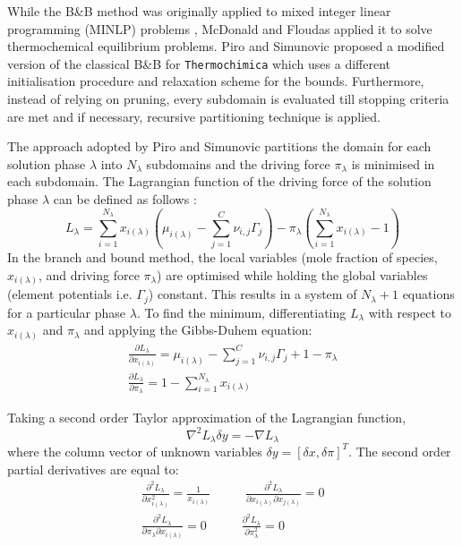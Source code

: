 	 While the B\&B method was originally applied to mixed integer linear programming (MINLP) problems \cite{Jaulin01}, McDonald and Floudas \cite{McDonald95} applied it to solve thermochemical equilibrium problems. Piro and Simunovic \cite{Piro16} proposed a modified version of the classical B\&B for \texttt{Thermochimica} which uses a different initialisation procedure and relaxation scheme for the bounds. Furthermore, instead of relying on pruning, every subdomain is evaluated till stopping criteria are met and if necessary, recursive partitioning technique is applied.

	 The approach adopted by Piro and Simunovic \cite{Piro16} partitions the domain for each solution phase $\lambda$ into $N_\lambda$ subdomains and the driving force $\pi_\lambda$ is minimised in each subdomain. The Lagrangian function of the driving force of the solution phase $\lambda$ can be defined as follows \cite{Piro16}:
	 \begin{equation}
	 	L_\lambda = \sum_{i=1}^{N_\lambda} x_{i(\lambda)}\left( \mu_{i(\lambda)} - \sum_{j=1}^{C} \nu_{i,j}\Gamma_j \right) - \pi_{\lambda}\left( \sum_{i=1}^{N_\lambda} x_{i(\lambda)} -  1 \right)
	 \end{equation}
	 In the branch and bound method, the local variables (mole fraction of species, $x_{i(\lambda)}$, and driving force $\pi_{\lambda}$) are optimised while holding the global variables (element potentials i.e. $\Gamma_j$) constant. This results in a system of $N_{\lambda} + 1$ equations for a particular phase $\lambda$. To find the minimum, differentiating $L_\lambda$ with respect to $x_{i(\lambda)}$ and $\pi_{\lambda}$ and applying the Gibbs-Duhem equation:
	 \begin{gather}
	 	\frac{\partial L_\lambda}{\partial x_{i(\lambda)}} = \mu_{i(\lambda)} - \sum_{j=1}^{C} \nu_{i,j}\Gamma_j + 1 - \pi_{\lambda} \\
		\frac{\partial L_\lambda}{\partial \pi_{\lambda}} = 1- \sum_{i=1}^{N_\lambda} x_{i(\lambda)}
	 \end{gather}

	 Taking a second order Taylor approximation of the Lagrangian function,
	 \begin{equation}
	 	\nabla^2 L_\lambda \delta y =  - \nabla L_\lambda
	 \end{equation}
	 where the column vector of unknown variables $\delta y = [\delta x, \delta \pi]^T$. The second order partial derivatives are equal to:
	  \begin{gather}
	 	\frac{\partial^2 L_\lambda}{\partial x_{i(\lambda)}^2} = \frac{1}{x_{i(\lambda)}} \mspace{50mu} \frac{\partial^2 L_\lambda}{\partial x_{i(\lambda)} \partial x_{j(\lambda)}} = 0 \\
		\frac{\partial^2 L_\lambda}{\partial \pi_{\lambda} \partial x_{i(\lambda)}} = 0 \mspace{50mu}  \frac{\partial^2 L_\lambda}{\partial \pi_{\lambda}^2} = 0
	 \end{gather}

